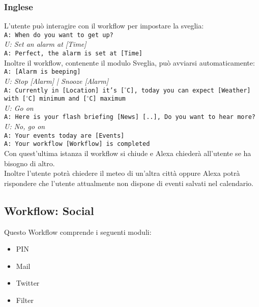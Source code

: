 \subsubsection{Inglese}
L'utente può interagire con il workflow per impostare la sveglia:\\
\texttt{A: When do you want to get up?}\\
\textit{U: Set an alarm at [Time]}\\
\texttt{A: Perfect, the alarm is set at [Time]}\\

Inoltre il workflow, contenente il modulo Sveglia, può avviarsi automaticamente:\\
\newline
\texttt{A: [Alarm is beeping]}\\
\textit{U: Stop [Alarm] | Snooze [Alarm]}\\
\texttt{A: Currently in [Location] it's [$^\circ$C], today you can expect [Weather] with [$^\circ$C] minimum and [$^\circ$C] maximum}\\
\textit{U: Go on}\\
\texttt{A: Here is your flash briefing [News] [..], Do you want to hear more?}\\
\textit{U: No, go on}\\
\texttt{A: Your events today are [Events]}\\
\texttt{A: Your workflow [Workflow] is completed}\\

Con quest'ultima istanza il workflow si chiude e Alexa chiederà all'utente se ha bisogno di altro.\\
Inoltre l'utente potrà chiedere il meteo di un'altra città oppure Alexa potrà rispondere che l'utente attualmente non dispone di eventi salvati nel calendario.

\subsection{Workflow: Social}
Questo Workflow comprende i seguenti moduli:
\begin{itemize}
	\item PIN
	\item Mail
	\item Twitter
	\item Filter
\end{itemize}
